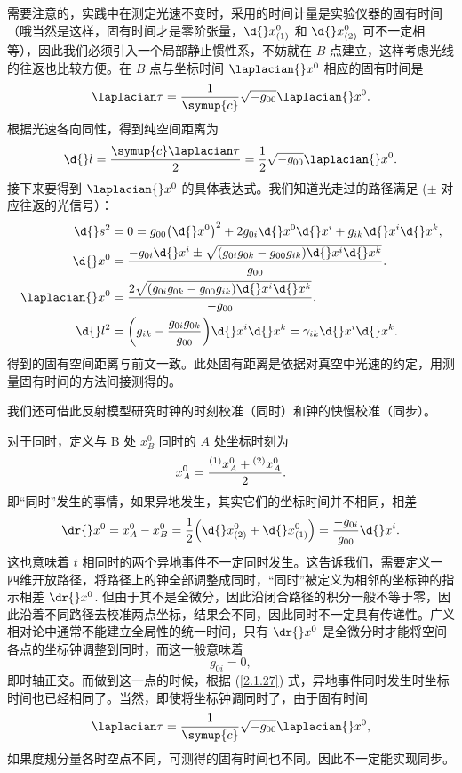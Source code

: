 \documentclass[UTF8, 12pt, a4paper, oneside, onecolumn, fontset=none]{ctexart}
\begin{document}
需要注意的，实践中在测定光速不变时，采用的时间计量是实验仪器的固有时间（哦当然是这样，固有时间才是零阶张量，$\d{}x^{0}_{\mleft(1\mright)}$ 和 $\d{}x^{0}_{\mleft(2\mright)}$ 可不一定相等），因此我们必须引入一个局部静止惯性系，不妨就在 $B$ 点建立，这样考虑光线的往返也比较方便。在 $B$ 点与坐标时间 $\laplacian{}x^{0}$ 相应的固有时间是
\begin{equation}
\laplacian\tau=\frac{1}{\symup{c}}\sqrt{-g_{00}}\laplacian{}x^{0}.
\end{equation}
根据光速各向同性，得到纯空间距离为
\begin{equation}
\d{}l=\frac{\symup{c}\laplacian\tau}{2}=\frac{1}{2}\sqrt{-g_{00}}\laplacian{}x^{0}.
\end{equation}
接下来要得到 $\laplacian{}x^{0}$ 的具体表达式。我们知道光走过的路径满足 ($\pm$ 对应往返的光信号）：
\begin{align}
\d{}s^{2}&=0=g_{00}\mleft(\d{}x^{0}\mright)^{2}+2g_{0i}\d{}x^{0}\d{}x^{i}+g_{ik}\d{}x^{i}\d{}x^{k},\\
\d{}x^{0}&=\frac{-g_{0i}\d{}x^{i}\pm\sqrt{\mleft(g_{0i}g_{0k}-g_{00}g_{ik}\mright)\d{}x^{i}\d{}x^{k}}}{g_{00}}.\label{往返}\\
\laplacian{}x^{0}&=\frac{2\sqrt{\mleft(g_{0i}g_{0k}-g_{00}g_{ik}\mright)\d{}x^{i}\d{}x^{k}}}{-g_{00}}.\\
\d{}l^{2}&=\mleft(g_{ik}-\frac{g_{0i}g_{0k}}{g_{00}}\mright)\d{}x^{i}\d{}x^{k}=\gamma_{ik}\d{}x^{i}\d{}x^{k}.
\end{align}
得到的固有空间距离与前文一致。此处固有距离是依据对真空中光速的约定，用测量固有时间的方法间接测得的。

我们还可借此反射模型研究时钟的时刻校准（同时）和钟的快慢校准（同步）。

对于同时，定义与 B 处 $x_{B}^{0}$ 同时的 $A$ 处坐标时刻为
\begin{equation}
x_{A}^{0}=\frac{{}^{\mleft(1\mright)}x_{A}^{0}+{}^{\mleft(2\mright)}x_{A}^{0}}{2}.
\end{equation}
即“同时”发生的事情，如果异地发生，其实它们的坐标时间并不相同，相差
\begin{equation}
\dr{}x^{0}=x_{A}^{0}-x_{B}^{0}=\frac{1}{2}\mleft(\d{}x^{0}_{\mleft(2\mright)}+\d{}x^{0}_{\mleft(1\mright)}\mright)=\frac{-g_{0i}}{g_{00}}\d{}x^{i}.\label{2.1.27}
\end{equation}
这也意味着 $t$ 相同时的两个异地事件不一定同时发生。这告诉我们，需要定义一四维开放路径，将路径上的钟全部调整成同时，“同时”被定义为相邻的坐标钟的指示相差 $\dr{}x^{0}$. 但由于其不是全微分，因此沿闭合路径的积分一般不等于零，因此沿着不同路径去校准两点坐标，结果会不同，因此同时不一定具有传递性。广义相对论中通常不能建立全局性的统一时间，只有 $\dr{}x^{0}$ 是全微分时才能将空间各点的坐标钟调整到同时，而这一般意味着
\begin{equation}
g_{0i}=0,
\end{equation}
即时轴正交。而做到这一点的时候，根据 (\ref{2.1.27}) 式，异地事件同时发生时坐标时间也已经相同了。当然，即使将坐标钟调同时了，由于固有时间
\begin{equation}
\laplacian\tau=\frac{1}{\symup{c}}\sqrt{-g_{00}}\laplacian{}x^{0},
\end{equation}
如果度规分量各时空点不同，可测得的固有时间也不同。因此不一定能实现同步。
\end{document}
